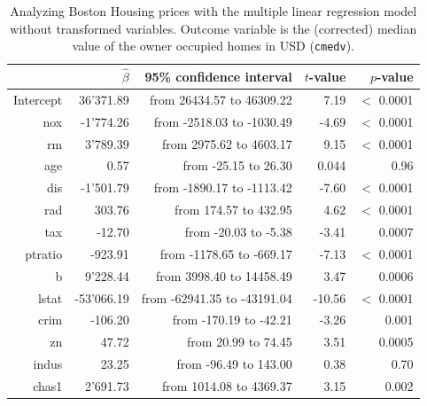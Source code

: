 \documentclass[11pt,a4paper,twoside]{book}\usepackage[]{graphicx}\usepackage[]{xcolor}
\begin{document}
\begin{table}[!h]
\centering
\caption{Analyzing Boston Housing prices with the multiple linear regression model without transformed variables. Outcome variable is the (corrected) median value of the owner occupied homes in USD (\texttt{cmedv}).} 
\label{tab:reg_tram}
\begingroup\footnotesize
\begin{tabular}{rrrrr}
  \toprule
 & $\hat\beta$ & 95\% confidence interval & $t$-value & $p$-value \\ 
  \midrule
Intercept & 36'371.89 & from 26434.57 to 46309.22 & 7.19 & $<$ 0.0001 \\ 
  nox & -1'774.26 & from -2518.03 to -1030.49 & -4.69 & $<$ 0.0001 \\ 
  rm & 3'789.39 & from 2975.62 to 4603.17 & 9.15 & $<$ 0.0001 \\ 
  age & 0.57 & from -25.15 to 26.30 & 0.044 & 0.96 \\ 
  dis & -1'501.79 & from -1890.17 to -1113.42 & -7.60 & $<$ 0.0001 \\ 
  rad & 303.76 & from 174.57 to 432.95 & 4.62 & $<$ 0.0001 \\ 
  tax & -12.70 & from -20.03 to -5.38 & -3.41 & 0.0007 \\ 
  ptratio & -923.91 & from -1178.65 to -669.17 & -7.13 & $<$ 0.0001 \\ 
  b & 9'228.44 & from 3998.40 to 14458.49 & 3.47 & 0.0006 \\ 
  lstat & -53'066.19 & from -62941.35 to -43191.04 & -10.56 & $<$ 0.0001 \\ 
  crim & -106.20 & from -170.19 to -42.21 & -3.26 & 0.001 \\ 
  zn & 47.72 & from 20.99 to 74.45 & 3.51 & 0.0005 \\ 
  indus & 23.25 & from -96.49 to 143.00 & 0.38 & 0.70 \\ 
  chas1 & 2'691.73 & from 1014.08 to 4369.37 & 3.15 & 0.002 \\ 
   \bottomrule
\end{tabular}
\endgroup
\end{table}
\end{document}
